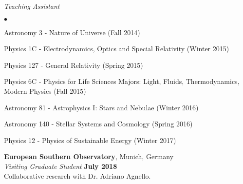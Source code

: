 \documentclass[margin,line]{res}
\newenvironment{list2}{
  \begin{list}{$\bullet$}{%
      \setlength{\itemsep}{0in}
      \setlength{\parsep}{0in} \setlength{\parskip}{0in}
      \setlength{\topsep}{0in} \setlength{\partopsep}{0in} 
      \setlength{\leftmargin}{0.2in}}}{\end{list}}
\begin{document}
\begin{resume}
{\em Teaching Assistant} \hfill {}\\
\begin{list2}
	\item Astronomy 3 - Nature of Universe (Fall 2014)
	\item Physics 1C - Electrodynamics, Optics and Special Relativity (Winter 2015)
	\item Physics 127 - General Relativity (Spring 2015)
	\item Physics 6C - Physics for Life Sciences Majors: Light, Fluids, Thermodynamics, Modern Physics (Fall 2015)
	\item Astronomy 81 - Astrophysics I: Stars and Nebulae (Winter 2016)
	\item Astronomy 140 - Stellar Systems and Cosmology (Spring 2016)
	\item Physics 12 - Physics of Sustainable Energy (Winter 2017)
\end{list2}

{\bf European Southern Observatory}, Munich, Germany\\
{\em Visiting Graduate Student} \hfill {\bf July 2018}\\
Collaborative research with Dr. Adriano Agnello.






\end{resume}
\end{document}
